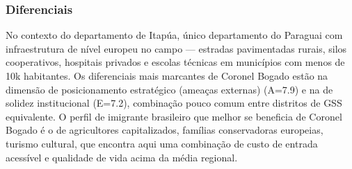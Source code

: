 \subsubsection*{Diferenciais}\label{dif-coronel-bogado-0708}
No contexto do departamento de Itapúa, único departamento do Paraguai com infraestrutura de nível europeu no campo — estradas pavimentadas rurais, silos cooperativos, hospitais privados e escolas técnicas em municípios com menos de 10k habitantes. Os diferenciais mais marcantes de Coronel Bogado estão na dimensão de posicionamento estratégico (ameaças externas) (A=7.9) e na de solidez institucional (E=7.2), combinação pouco comum entre distritos de GSS equivalente. O perfil de imigrante brasileiro que melhor se beneficia de Coronel Bogado é o de agricultores capitalizados, famílias conservadoras europeias, turismo cultural, que encontra aqui uma combinação de custo de entrada acessível e qualidade de vida acima da média regional.
